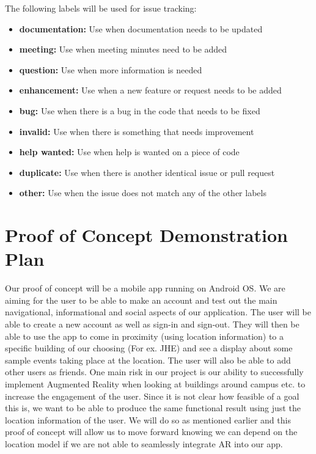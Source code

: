 \documentclass{article}
\begin{document}
The following labels will be used for issue tracking:
\begin{itemize}
    \item \textbf{documentation:} Use when documentation needs to be updated
    \item \textbf{meeting:} Use when meeting minutes need to be added
    \item \textbf{question:} Use when more information is needed
    \item \textbf{enhancement:} Use when a new feature or request needs to be added
    \item \textbf{bug:} Use when there is a bug in the code that needs to be fixed
    \item \textbf{invalid:} Use when there is something that needs improvement
    \item \textbf{help wanted:} Use when help is wanted on a piece of code
    \item \textbf{duplicate:} Use when there is another identical issue or pull request
    \item \textbf{other:} Use when the issue does not match any of the other labels
\end{itemize}

\section{Proof of Concept Demonstration Plan}

Our proof of concept will be a mobile app running on Android OS. We are aiming for the user to be able to make an account and test out the main navigational, informational and social aspects of our application. The user will be able to create a new account as well as sign-in and sign-out. They will then be able to use the app to come in proximity (using location information) to a specific building of our choosing (For ex. JHE) and see a display about some sample events taking place at the location. The user will also be able to add other users as friends. One main risk in our project is our ability to successfully implement Augmented Reality when looking at buildings around campus etc. to increase the engagement of the user. Since it is not clear how feasible of a goal this is, we want to be able to produce the same functional result using just the location information of the user. We will do so as mentioned earlier and this proof of concept will allow us to move forward knowing we can depend on the location model if we are not able to seamlessly integrate AR into our app.
\end{document}

